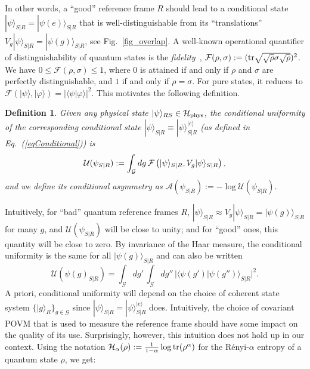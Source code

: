 \documentclass[aps,10pt,twocolumn,showpacs,pra,citeautoscript,amsmath,amssymb,floatfix,superscriptaddress]{revtex4-1}
\newtheorem{definition}{Definition}
\begin{document}
In other words, a ``good'' reference frame $R$ should lead to a conditional state $|\psi\rangle_{S|R}=|\psi(e)\rangle_{S|R}$ that is well-distinguishable from its ``translations'' $V_g |\psi\rangle_{S|R}=|\psi(g)\rangle_{S|R}$, see Fig.~\ref{fig_overlap}. A well-known operational quantifier of distinguishability of quantum states is the \emph{fidelity}~\cite{NielsenChuang}, $\mathcal{F}(\rho,\sigma):=({\rm tr}\sqrt{\sqrt{\rho}\sigma\sqrt{\rho}})^2$. We have $0\leq\mathcal{F}(\rho,\sigma)\leq 1$, where $0$ is attained if and only if $\rho$ and $\sigma$ are perfectly distinguishable, and $1$ if and only if $\rho=\sigma$. For pure states, it reduces to $\mathcal{F}(|\psi\rangle,|\varphi\rangle)=|\langle\psi|\varphi\rangle|^2$. This motivates the following definition.
\begin{definition}
Given any physical state $|\psi\rangle_{RS}\in\mathcal{H}_{\rm phys}$, the \emph{conditional uniformity} of the corresponding conditional state $|\psi\rangle_{S|R}\equiv |\psi\rangle_{S|R}^{|e\rangle}$ (as defined in Eq.~(\ref{eqConditional})) is
\begin{equation}
   \mathcal{U}(\psi_{S|R}):=
   \int_{\mathcal{G}}dg\, \mathcal{F}\left(\strut|\psi\rangle_{S|R},V_g|\psi\rangle_{S|R}\right),
   \label{EqDef1}
\end{equation}
and we define its \emph{conditional asymmetry} as $\mathcal{A}(\psi_{S|R}):=-\log \mathcal{U}(\psi_{S|R})$.
\end{definition}
Intuitively, for ``bad'' quantum reference frames $R$, $|\psi\rangle_{S|R}\approx V_g|\psi\rangle_{S|R}=|\psi(g)\rangle_{S|R}$ for many $g$, and $\mathcal{U}(\psi_{S|R})$ will be close to unity; and for ``good'' ones, this quantity will be close to zero. By invariance of the Haar measure, the conditional uniformity is the same for all $|\psi(g)\rangle_{S|R}$ and can also be written
\begin{equation}
   \mathcal{U}(\psi(g)_{S|R})
   =\int_{\mathcal{G}}dg'\,\int_{\mathcal{G}}dg''\, |\langle\psi(g')|\psi(g'')\rangle_{S|R}|^2.
   \label{eqPower}
\end{equation}
A priori, conditional uniformity will depend on the choice of coherent state system $\{|g\rangle_R\}_{g\in\mathcal{G}}$ since $|\psi\rangle_{S|R}=|\psi\rangle_{S|R}^{|e\rangle}$ does. Intuitively, the choice of covariant POVM that is used to measure the reference frame should have some impact on the quality of its use. Surprisingly, however, this intuition does not hold up in our context. Using the notation $\mathcal{H}_\alpha(\rho):=\frac 1 {1-\alpha}\log{\rm tr}(\rho^\alpha)$ for the R\'enyi-$\alpha$ entropy of a quantum state $\rho$, we get:
\end{document}
